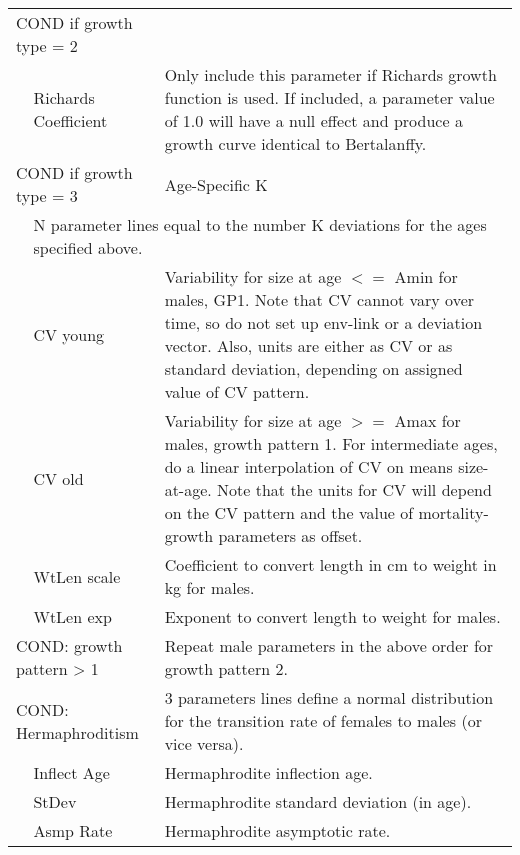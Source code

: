 \begin{longtable}{p{1cm} p{2.25cm} p{10cm}}
	\multicolumn{2}{l}{COND if growth type = 2} & \Tstrut\\
	& Richards Coefficient & Only include this parameter if Richards growth function is used. If included, a parameter value of 1.0 will have a null effect and produce a growth curve identical to Bertalanffy. \\
	\multicolumn{2}{l}{COND if growth type = 3} & Age-Specific K \\
	& \multicolumn{2}{l}{N parameter lines equal to the number K deviations for the ages specified above.} \Bstrut\\
	\hline

	\Tstrut & CV young & Variability for size at age $<=$ Amin for males, GP1. Note that CV cannot vary over time, so do not set up env-link or a deviation vector. Also, units are either as CV or as standard deviation, depending on assigned value of CV pattern. \\
	& CV old & Variability for size at age $>=$ Amax for males, growth pattern 1. For intermediate ages, do a linear interpolation of CV on means size-at-age. Note that the units for CV will depend on the CV pattern and the value of mortality-growth parameters as offset. \\
	\hline

	\Tstrut & WtLen scale & Coefficient to convert length in cm to weight in kg for males. \\
	& WtLen exp & Exponent to convert length to weight for males. \Bstrut\\

	\multicolumn{2}{l}{COND: growth pattern > 1} \Tstrut & Repeat male parameters in the above order for growth pattern 2. \\
	\hline

	\multicolumn{2}{l}{COND: Hermaphroditism} \Tstrut & 3 parameters lines define a normal distribution for the transition rate of females to males (or vice versa). \\
	& Inflect Age & Hermaphrodite inflection age. \\
	& StDev & Hermaphrodite standard deviation (in age). \\
	& Asmp Rate & Hermaphrodite asymptotic rate. \Bstrut\\
	\hline


\end{longtable}

